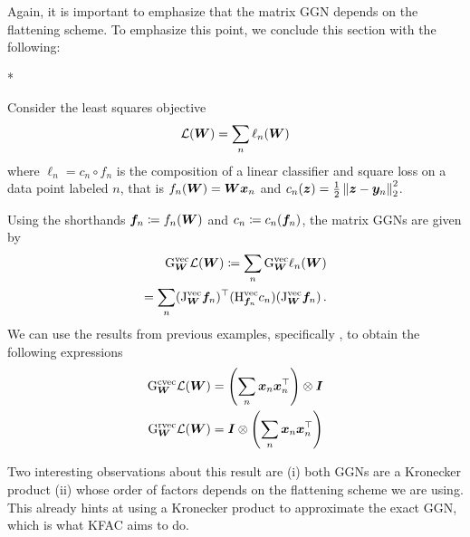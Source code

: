 Again, it is important to emphasize that the matrix GGN depends on the flattening scheme.
To emphasize this point, we conclude this section with the following:

\switchcolumn[1]*
\switchcolumn[0]

\begin{example}
  Consider the least squares objective
  \begin{align*}
    {\mathcal{L}}({\bm{W}}) = \sum_n \ell_n({\bm{W}})
  \end{align*}
  where $\ell_n = c_n \circ f_n$ is the composition of a linear classifier and square loss
  on a data point labeled $n$, that is
  $f_n({\bm{W}}) = {\bm{W}} {\bm{x}}_n$ and $c_n({\bm{z}}) = \frac{1}{2}\left\lVert {\bm{z}} - {\bm{y}}_n \right\rVert^2_2$.

  Using the shorthands ${\bm{f}}_n \coloneq f_n({\bm{W}})$ and $c_n \coloneq c_n({\bm{f}}_n)$, the matrix GGNs are given by
  \begin{align*}
    \mathrm{G}_{{\bm{W}}}^{\operatorname{vec}}{\mathcal{L}}({\bm{W}})
    \coloneq
    \sum_n
    \mathrm{G}_{{\bm{W}}}^{\operatorname{vec}} \ell_n({\bm{W}})
    \\
    =
    \sum_n
    (\mathrm{J}^{\operatorname{vec}}_{{\bm{W}}} {\bm{f}}_n)^{\top}
    (\mathrm{H}^{\operatorname{vec}}_{{\bm{f}}_n} c_n)
    (\mathrm{J}^{\operatorname{vec}}_{{\bm{W}}} {\bm{f}}_n)\,.
  \end{align*}
  We can use the results from previous examples, specifically , to obtain the following expressions
  \begin{align*}
    \mathrm{G}_{{\bm{W}}}^{\operatorname{cvec}}{\mathcal{L}}({\bm{W}})
    & =
      \left(
      \sum_n {\bm{x}}_n {\bm{x}}_n^{\top}
      \right)
      \otimes {\bm{I}}
    \\
    \mathrm{G}_{{\bm{W}}}^{\operatorname{rvec}}{\mathcal{L}}({\bm{W}})
    & =
      {\bm{I}}
      \otimes
      \left(
      \sum_n {\bm{x}}_n {\bm{x}}_n^{\top}
      \right)
  \end{align*}
\end{example}
Two interesting observations about this result are (i) both GGNs are a Kronecker product (ii) whose order of factors depends on the flattening scheme we are using.
This already hints at using a Kronecker product to approximate the exact GGN, which is what KFAC aims to do.


